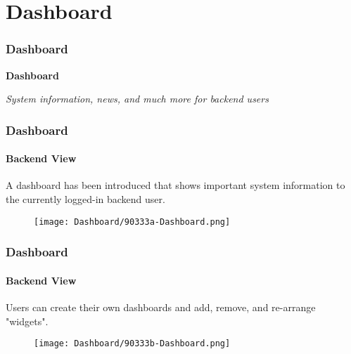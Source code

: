 %

\section{Dashboard}
\begin{frame}[fragile]
	\frametitle{Dashboard}

	\begin{center}\huge{\color{typo3darkgrey}\textbf{Dashboard}}\end{center}
	\begin{center}\large{\textit{System information, news, and much more for backend users}}\end{center}

\end{frame}


\begin{frame}[fragile]
	\frametitle{Dashboard}
	\framesubtitle{Backend View}

	A dashboard has been introduced that shows important system information to the currently logged-in backend user.

	\begin{figure}
		\texttt{[image: Dashboard/90333a-Dashboard.png]}
	\end{figure}

\end{frame}


\begin{frame}[fragile]
	\frametitle{Dashboard}
	\framesubtitle{Backend View}

	Users can create their own dashboards and add, remove, and re-arrange "widgets".

	\begin{figure}
		\texttt{[image: Dashboard/90333b-Dashboard.png]}
	\end{figure}

\end{frame}

